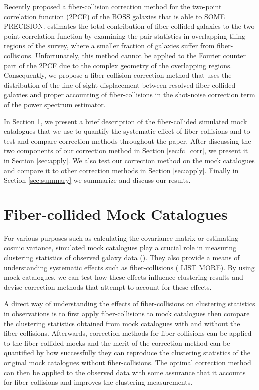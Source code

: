 \documentclass{emulateapj}
\begin{document}
Recently \cite{Guo:2012aa} proposed a fiber-collision correction method for the two-point correlation function (2PCF) of the BOSS galaxies that is able to SOME PRECISION. \cite{Guo:2012aa} estimates the total contribution of fiber-collided galaxies to the two point correlation function by examining the pair statistics in overlapping tiling regions of the survey, where a smaller fraction of galaxies suffer from fiber-collisions. Unfortunately, this method cannot be applied to the Fourier counter part of the 2PCF due to the complex geometry of the overlapping regions. Consequently, we propose a fiber-collision correction method that uses the distribution of the line-of-sight displacement between resolved fiber-collided galaxies and proper accounting of fiber-collisions in the shot-noise correction term of the power spectrum estimator. 

In Section \ref{sec:catalog}, we present a brief description of the fiber-collided simulated mock catalogues that we use to quantify the systematic effect of fiber-collisions and to test and compare correction methods throughout the paper. After discussing the two components of our correction method in Section \ref{sec:fc_corr}, we present it in Section \ref{sec:apply}. We also test our correction method on the mock catalogues and compare it to other correction methods in Section \ref{sec:apply}. Finally in Section \ref{sec:summary} we summarize and discuss our results. 
\section{Fiber-collided Mock Catalogues} \label{sec:catalog}
For various purposes such as calculating the covariance matrix or estimating cosmic variance, simulated mock catalogues play a crucial role in measuring clustering statistics of observed galaxy data (\citealt{Scoccimarro:2002aa, Anderson:2012aa, Manera:2013aa}). They also provide a means of understanding systematic effects such as fiber-collisions (\citealt{Yoon:2008aa, Guo:2012aa} LIST MORE). By using mock catalogues, we can test how these effects influence clustering results and devise correction methods that attempt to account for these effects.

A direct way of understanding the effects of fiber-collisions on clustering statistics in observations is to first apply fiber-collisions to mock catalogues then compare the clustering statistics obtained from mock catalogues with and without the fiber collisions. Afterwards, correction methods for fiber-collisions can be applied to the fiber-collided mocks and the merit of the correction method can be quantified by how successfully they can reproduce the clustering statistics of the original mock catalogues without fiber-collisions. The optimal correction method can then be applied to the observed data with some assurance that it accounts for fiber-collisions and improves the clustering measurements. 
\end{document}
